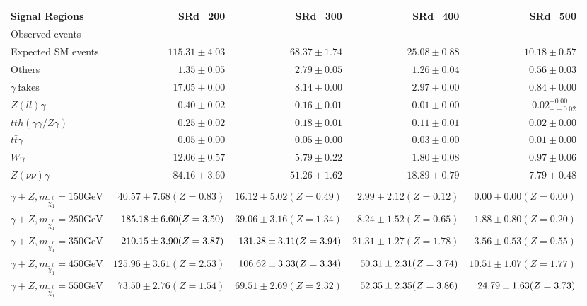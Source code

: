 \begin{tabular}{lrrrr}
\hline
Signal Regions & SRd\_200 & SRd\_300 & SRd\_400 & SRd\_500 \\
\hline
Observed events & - & - & - & - \\
\hline
Expected SM events & $115.31 \pm 4.03$ & $68.37 \pm 1.74$ & $25.08 \pm 0.88$ & $10.18 \pm 0.57$ \\
\hline
Others & $1.35 \pm 0.05$ & $2.79 \pm 0.05$ & $1.26 \pm 0.04$ & $0.56 \pm 0.03$ \\
$\gamma\ \text{fakes}$ & $17.05 \pm 0.00$ & $8.14 \pm 0.00$ & $2.97 \pm 0.00$ & $0.84 \pm 0.00$ \\
$Z(ll)\gamma$ & $0.40 \pm 0.02$ & $0.16 \pm 0.01$ & $0.01 \pm 0.00$ & $-0.02_{--0.02}^{+0.00}$ \\
$t\bar{t}h(\gamma\gamma/Z\gamma)$ & $0.25 \pm 0.02$ & $0.18 \pm 0.01$ & $0.11 \pm 0.01$ & $0.02 \pm 0.00$ \\
$t\bar{t}\gamma$ & $0.05 \pm 0.00$ & $0.05 \pm 0.00$ & $0.03 \pm 0.00$ & $0.01 \pm 0.00$ \\
$W\gamma$ & $12.06 \pm 0.57$ & $5.79 \pm 0.22$ & $1.80 \pm 0.08$ & $0.97 \pm 0.06$ \\
$Z(\nu\nu)\gamma$ & $84.16 \pm 3.60$ & $51.26 \pm 1.62$ & $18.89 \pm 0.79$ & $7.79 \pm 0.48$ \\
\hline
 &  &  &  &  \\
\hline
$\gamma+Z, m_{\tilde{\chi}_{1}^{0}} = 150 \text{GeV}$ & $ 40.57 \pm 7.68 (Z=0.83)$ & $ 16.12 \pm 5.02 (Z=0.49)$ & $ 2.99 \pm 2.12 (Z=0.12)$ & $ 0.00 \pm 0.00 (Z=0.00)$ \\
$\gamma+Z, m_{\tilde{\chi}_{1}^{0}} = 250 \text{GeV}$ & $\cellcolor{lightgreen} 185.18 \pm 6.60 (Z=3.50)$ & $ 39.06 \pm 3.16 (Z=1.34)$ & $ 8.24 \pm 1.52 (Z=0.65)$ & $ 1.88 \pm 0.80 (Z=0.20)$ \\
$\gamma+Z, m_{\tilde{\chi}_{1}^{0}} = 350 \text{GeV}$ & $\cellcolor{lightgreen} 210.15 \pm 3.90 (Z=3.87)$ & $\cellcolor{lightgreen} 131.28 \pm 3.11 (Z=3.94)$ & $ 21.31 \pm 1.27 (Z=1.78)$ & $ 3.56 \pm 0.53 (Z=0.55)$ \\
$\gamma+Z, m_{\tilde{\chi}_{1}^{0}} = 450 \text{GeV}$ & $ 125.96 \pm 3.61 (Z=2.53)$ & $\cellcolor{lightgreen} 106.62 \pm 3.33 (Z=3.34)$ & $\cellcolor{lightgreen} 50.31 \pm 2.31 (Z=3.74)$ & $ 10.51 \pm 1.07 (Z=1.77)$ \\
$\gamma+Z, m_{\tilde{\chi}_{1}^{0}} = 550 \text{GeV}$ & $ 73.50 \pm 2.76 (Z=1.54)$ & $ 69.51 \pm 2.69 (Z=2.32)$ & $\cellcolor{lightgreen} 52.35 \pm 2.35 (Z=3.86)$ & $\cellcolor{lightgreen} 24.79 \pm 1.63 (Z=3.73)$ \\

\end{tabular}
